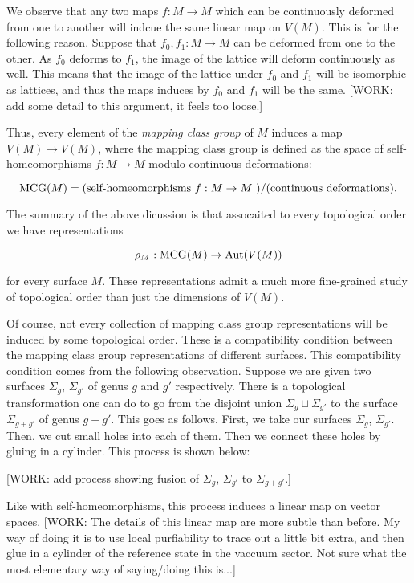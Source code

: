 We observe that any two maps $f:M\to M$ which can be continuously deformed from one to another will indcue the same linear map on $V(M)$. This is for the following reason. Suppose that $f_0,f_1:M\to M$ can be deformed from one to the other. As $f_0$ deforms to $f_1$, the image of the lattice will deform continuously as well. This means that the image of the lattice under $f_0$ and $f_1$ will be isomorphic as lattices, and thus the maps induces by $f_0$ and $f_1$ will be the same. [WORK: add some detail to this argument, it feels too loose.]

Thus, every element of the \textit{mapping class group} of $M$ induces a map $V(M)\to V(M)$, where the mapping class group is defined as the space of self-homeomorphisms $f:M\to M$ modulo continuous deformations:

$$\operatorname{MCG}(M)=\text{(self-homeomorphisms $f:M\to M$ )}/\text{(continuous deformations)}.$$

The summary of the above dicussion is that assocaited to every topological order we have representations

$$\rho_{M}:\operatorname{MCG}(M)\to \operatorname{Aut}(V(M))$$

for every surface $M$. These representations admit a much more fine-grained study of topological order than just the dimensions of $V(M)$.

Of course, not every collection of mapping class group representations will be induced by some topological order. These is a compatibility condition between the mapping class group representations of different surfaces. This compatibility condition comes from the following observation. Suppose we are given two surfaces $\Sigma_{g}$, $\Sigma_{g'}$ of genus $g$ and $g'$ respectively. There is a topological transformation one can do to go from the disjoint union $\Sigma_{g}\sqcup\Sigma_{g'}$ to the surface $\Sigma_{g+g'}$ of genus $g+g'$. This goes as follows. First, we take our surfaces $\Sigma_{g}$, $\Sigma_{g'}$. Then, we cut small holes into each of them. Then we connect these holes by gluing in a cylinder. This process is shown below:

[WORK: add process showing fusion of $\Sigma_{g}$, $\Sigma_{g'}$ to $\Sigma_{g+g'}$.]

Like with self-homeomorphisms, this process induces a linear map on vector spaces. [WORK: The details of this linear map are more subtle than before. My way of doing it is to use local purfiability to trace out a little bit extra, and then glue in a cylinder of the reference state in the vaccuum sector. Not sure what the most elementary way of saying/doing this is...]

